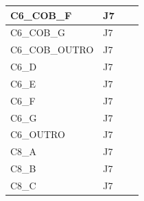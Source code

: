\begin{longtable}{|l|l|l|l|}
C6\_COB\_F                       & J7                                                &                                                  &                                                  \\ \hline
C6\_COB\_G                       & J7                                                &                                                  &                                                  \\ \hline
C6\_COB\_OUTRO                       & J7                                                &                                                  &                                                  \\ \hline
C6\_D                           & J7                                                &                                                  &                                                  \\ \hline
C6\_E                           & J7                                                &                                                  &                                                  \\ \hline
C6\_F                           & J7                                                &                                                  &                                                  \\ \hline
C6\_G                           & J7                                                &                                                  &                                                  \\ \hline
C6\_OUTRO                           & J7                                                &                                                  &                                                  \\ \hline
C8\_A                           & J7                                                &                                                  &                                                  \\ \hline
C8\_B                           & J7                                                &                                                  &                                                  \\ \hline
C8\_C                           & J7                                                &                                                  &                                                  \\ \hline

\end{longtable}
